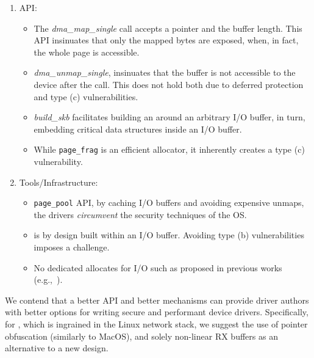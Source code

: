 \begin{enumerate}
    \item API: 
    \begin{itemize}[wide, labelwidth=!, labelindent=0pt]
        \item The \textit{dma\_map\_single} call accepts a pointer and the buffer length. This API insinuates that only the mapped bytes are exposed, when, in fact, the whole page is accessible.
        \item \textit{dma\_unmap\_single}, insinuates that the buffer is not accessible to the device after the call. This does not hold both due to deferred protection and type (c) \subpage{} vulnerabilities.
        \item \textit{build\_skb} facilitates building an \skb{} around an arbitrary I/O buffer, in turn, embedding critical data structures inside an I/O buffer.
        \item While \texttt{page\_frag} is an efficient allocator, it inherently creates a type (c) \subpage{} vulnerability.
    \end{itemize} 
    \item Tools/Infrastructure: 
    \begin{itemize}[wide, labelwidth=!, labelindent=0pt]
            \item \texttt{page\_pool} API, by caching I/O buffers and avoiding expensive unmaps, the drivers \emph{circumvent} the security techniques of the OS. 
            \item \shinfo{} is by design built within an I/O buffer. Avoiding type (b) \subpage{} vulnerabilities imposes a challenge.
            \item No dedicated allocates for I/O such as proposed in previous works (e.g.,~\cite{MSMT18,MMT16}).
    \end{itemize}
\end{enumerate}

We contend that a better API and better mechanisms can provide driver authors with better options for writing secure and performant device drivers. Specifically, for \shinfo{}, which is ingrained in the Linux network stack, we suggest the use of pointer obfuscation (similarly to MacOS), and solely non-linear RX buffers as an alternative to a new design. 

